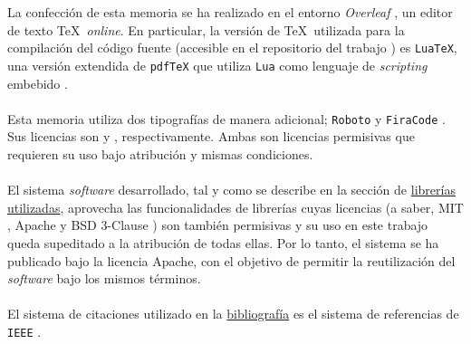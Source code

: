  \label{sec:consideraciones}

    La confección de esta memoria se ha realizado en el entorno \textit{Overleaf} \cite{OVERLEAF}, un editor de texto \TeX\  \textit{online}. En particular, la versión de \TeX\  utilizada para la compilación del código fuente (accesible en el repositorio del trabajo \cite{TFGTEX}) es \texttt{LuaTeX}, una versión extendida de \texttt{pdfTeX} que utiliza \texttt{Lua} como lenguaje de \textit{scripting} embebido \cite{LUATEX}.
    \\ \\
    Esta memoria utiliza dos tipografías de manera adicional; \texttt{Roboto} \cite{ROBOTO} y \texttt{FiraCode} \cite{FIRACODE}. Sus licencias son \cite{LICAPACHE} y \cite{LICSIL}, respectivamente. Ambas son licencias permisivas que requieren su uso bajo atribución y mismas condiciones.
    \\ \\
    El sistema \textit{software} desarrollado, tal y como se describe en la sección de \hyperref[subsubsec:librerias]{librerías utilizadas}, aprovecha las funcionalidades de librerías cuyas licencias (a saber, MIT \cite{LICMIT}, Apache \cite{LICAPACHE} y BSD 3-Clause \cite{LICBSD3}) son también permisivas y su uso en este trabajo queda supeditado a la atribución de todas ellas. Por lo tanto, el sistema se ha publicado bajo la licencia Apache, con el objetivo de permitir la reutilización del \textit{software} bajo los mismos términos.
    \\ \\
    El sistema de citaciones utilizado en la \hyperref[sec:referencias]{bibliografía} es el sistema de referencias de \texttt{IEEE} \cite{IEEEREF}.

\newpage